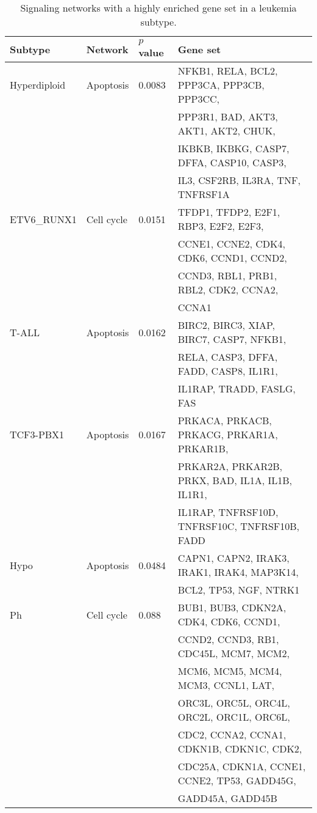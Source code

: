 \documentclass[runningheads,a4paper]{llncs}
\begin{document}
\begin{table}[t]
\centering
\caption{Signaling networks with a highly enriched gene set in a leukemia
subtype.}
\label{tab:gsea_edge}
\begin{tabular}{|l|l|l|l|}
\hline
Subtype & Network & $p$ value & Gene set \\ \hline
Hyperdiploid & Apoptosis & 0.0083 & \scriptsize{NFKB1, RELA, BCL2, PPP3CA,
PPP3CB, PPP3CC,} \\
 & & & \scriptsize{PPP3R1, BAD, AKT3, AKT1, AKT2, CHUK,} \\
 & & & \scriptsize{IKBKB, IKBKG, CASP7, DFFA, CASP10, CASP3,} \\
 & & & \scriptsize{IL3, CSF2RB, IL3RA, TNF, TNFRSF1A} \\
\hline
ETV6\_RUNX1 & Cell cycle & 0.0151 & \scriptsize{TFDP1, TFDP2, E2F1, RBP3, E2F2,
E2F3,} \\
& & & \scriptsize{CCNE1, CCNE2, CDK4, CDK6, CCND1, CCND2,} \\
& & & \scriptsize{CCND3, RBL1, PRB1, RBL2, CDK2, CCNA2,} \\
& & & \scriptsize{CCNA1} \\
\hline
T-ALL & Apoptosis & 0.0162 & \scriptsize{BIRC2, BIRC3, XIAP, BIRC7, CASP7,
NFKB1,} \\
& & & \scriptsize{RELA, CASP3, DFFA, FADD, CASP8, IL1R1,} \\
& & & \scriptsize{IL1RAP, TRADD, FASLG, FAS} \\
\hline
TCF3-PBX1 & Apoptosis & 0.0167 & \scriptsize{PRKACA, PRKACB, PRKACG, PRKAR1A,
PRKAR1B,} \\
& & & \scriptsize{PRKAR2A, PRKAR2B, PRKX, BAD, IL1A, IL1B, IL1R1,} \\
& & & \scriptsize{IL1RAP, TNFRSF10D, TNFRSF10C, TNFRSF10B, FADD} \\
\hline
Hypo & Apoptosis & 0.0484 & \scriptsize{CAPN1, CAPN2, IRAK3, IRAK1, IRAK4,
MAP3K14,} \\
& & & \scriptsize{BCL2, TP53, NGF, NTRK1} \\
\hline
Ph & Cell cycle & 0.088 & \scriptsize{BUB1, BUB3, CDKN2A, CDK4, CDK6, CCND1,}\\
& & & \scriptsize{CCND2, CCND3, RB1, CDC45L, MCM7, MCM2,} \\
& & & \scriptsize{MCM6, MCM5, MCM4, MCM3, CCNL1, LAT,} \\
& & & \scriptsize{ORC3L, ORC5L, ORC4L, ORC2L, ORC1L, ORC6L,} \\
& & & \scriptsize{CDC2, CCNA2, CCNA1, CDKN1B, CDKN1C, CDK2,} \\
& & & \scriptsize{CDC25A, CDKN1A, CCNE1, CCNE2, TP53, GADD45G,} \\
& & & \scriptsize{GADD45A, GADD45B} \\
\hline
\end{tabular}
\end{table}
\end{document}
